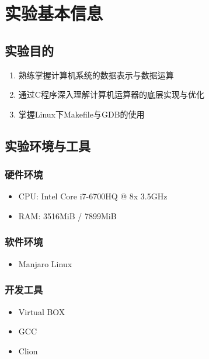 \section{实验基本信息}

\subsection{实验目的}
\begin{enumerate}
    \item 熟练掌握计算机系统的数据表示与数据运算
    \item 通过C程序深入理解计算机运算器的底层实现与优化
    \item 掌握Linux下Makefile与GDB的使用
\end{enumerate}

\subsection{实验环境与工具}

\subsubsection{硬件环境}
\begin{itemize}
    \item CPU: Intel Core i7-6700HQ @ 8x 3.5GHz
    \item RAM: 3516MiB / 7899MiB
\end{itemize}

\subsubsection{软件环境}
\begin{itemize}
    \item Manjaro Linux

\end{itemize}

\subsubsection{开发工具}
\begin{itemize}
    \item Virtual BOX
    \item GCC
    \item Clion
\end{itemize}